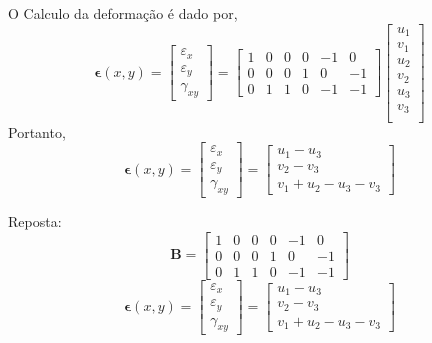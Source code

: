 % 
O Calculo da deformação é dado por,
%
\begin{equation}
	\mathbf{\epsilon}(x, y) = 
	\begin{bmatrix}
	\varepsilon_x\\
	\varepsilon_y\\
	\gamma_{xy}	
	\end{bmatrix}
	 = 
	\begin{bmatrix}
		1& 0   & 0 & 0 & -1 & 0\\
		0& 0  & 0 & 1 &  0 & -1\\
		0& 1  & 1 & 0 & -1 & -1
	\end{bmatrix}
	\begin{bmatrix}
	u_1\\
	v_1\\
	u_2\\
	v_2\\
	u_3\\
	v_3\\	
    \end{bmatrix}
\end{equation}
%
Portanto,
\begin{equation}
	\mathbf{\epsilon}(x, y) = 
	\begin{bmatrix}
	\varepsilon_x\\
	\varepsilon_y\\
	\gamma_{xy}	
	\end{bmatrix}
	= 
	\begin{bmatrix}
	u_1 - u_3\\
	v_2 - v_3\\
	v_1 + u_2 - u_3 - v_3
	\end{bmatrix}
\end{equation}

\color{blue}
Reposta:
\begin{equation}
	\mathbf{B} = 
	\begin{bmatrix}
		1& 0   & 0 & 0 & -1 & 0\\
		0& 0  & 0 & 1 &  0 & -1\\
		0& 1  & 1 & 0 & -1 & -1
	\end{bmatrix}
\end{equation}
\begin{equation}
	\mathbf{\epsilon}(x, y) = 
	\begin{bmatrix}
		\varepsilon_x\\
		\varepsilon_y\\
		\gamma_{xy}	
	\end{bmatrix}
	= 
	\begin{bmatrix}
		u_1 - u_3\\
		v_2 - v_3\\
		v_1 + u_2 - u_3 - v_3
	\end{bmatrix}
\end{equation}
\color{black}


